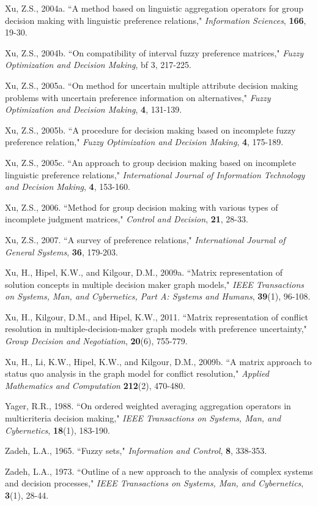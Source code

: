 \documentclass[letterpaper,12pt,titlepage,oneside,final]{book}
\begin{document}
\begin{thebibliography}{}
Xu, Z.S., 2004a. ``A method based on linguistic aggregation operators for group decision making with linguistic preference relations," \emph{Information Sciences}, {\bf 166}, 19-30.

Xu, Z.S., 2004b. ``On compatibility of interval fuzzy preference matrices," \emph{Fuzzy Optimization and Decision Making}, {bf 3}, 217-225.

Xu, Z.S., 2005a. ``On method for uncertain multiple attribute decision making problems with uncertain preference information on alternatives," \emph{Fuzzy Optimization and Decision Making}, {\bf 4}, 131-139.

Xu, Z.S., 2005b. ``A procedure for decision making based on incomplete fuzzy preference relation," \emph{Fuzzy Optimization and Decision Making}, {\bf 4}, 175-189.

Xu, Z.S., 2005c. ``An approach to group decision making based on incomplete linguistic preference relations," \emph{International Journal of Information Technology and Decision Making}, {\bf 4}, 153-160.

Xu, Z.S., 2006. ``Method for group decision making with various types of incomplete judgment matrices," \emph{Control and Decision}, {\bf 21}, 28-33.

Xu, Z.S., 2007. ``A survey of preference relations," \emph{International Journal of General Systems}, {\bf 36}, 179-203.

Xu, H., Hipel, K.W., and Kilgour, D.M., 2009a. ``Matrix representation of solution concepts in multiple decision maker graph models," \emph{IEEE Transactions on Systems, Man, and Cybernetics, Part A: Systems and Humans}, {\bf 39}(1), 96-108.

Xu, H., Kilgour, D.M., and Hipel, K.W., 2011. ``Matrix representation of conflict resolution in multiple-decision-maker graph models with preference uncertainty," \emph{Group Decision and Negotiation}, {\bf 20}(6), 755-779.

Xu, H., Li, K.W., Hipel, K.W., and Kilgour, D.M., 2009b. ``A matrix approach to status quo analysis in the graph model for conflict resolution," \emph{Applied Mathematics and Computation} {\bf 212}(2), 470-480.

Yager, R.R., 1988. ``On ordered weighted averaging aggregation operators in multicriteria decision making," \emph{IEEE Transactions on Systems, Man, and Cybernetics}, {\bf 18}(1), 183-190.

Zadeh, L.A., 1965. ``Fuzzy sets," \emph{Information and Control}, {\bf 8}, 338-353.

Zadeh, L.A., 1973. ``Outline of a new approach to the analysis of complex systems and decision processes," \emph{IEEE Transactions on Systems, Man, and Cybernetics}, {\bf 3}(1), 28-44.

\end{thebibliography}
\end{document}
